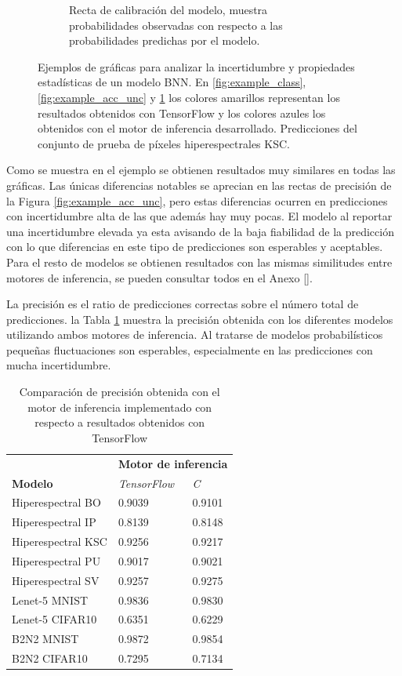 \begin{figure}[H]
\begin{subfigure}[b]{0.48\textwidth}
         \caption{Recta de calibración del modelo, muestra probabilidades observadas con respecto a las probabilidades predichas por el modelo.}
         \label{fig:example_calibration}
     \end{subfigure}
        \caption{Ejemplos de gráficas para analizar la incertidumbre y propiedades estadísticas de un modelo BNN. En \ref{fig:example_class}, \ref{fig:example_acc_unc} y \ref{fig:example_calibration} los colores amarillos representan los resultados obtenidos con TensorFlow y los colores azules los obtenidos con el motor de inferencia desarrollado. Predicciones del conjunto de prueba de píxeles hiperespectrales KSC.}
        \label{fig:figure_example}
\end{figure}

Como se muestra en el ejemplo se obtienen resultados muy similares en todas las gráficas. Las únicas diferencias notables se aprecian en las rectas de precisión de la Figura \ref{fig:example_acc_unc}, pero estas diferencias ocurren en predicciones con incertidumbre alta de las que además hay muy pocas. El modelo al reportar una incertidumbre elevada ya esta avisando de la baja fiabilidad de la predicción con lo que diferencias en este tipo de predicciones son esperables y aceptables. Para el resto de modelos se obtienen resultados con las mismas similitudes entre motores de inferencia, se pueden consultar todos en el Anexo \ref{}.

La precisión es el ratio de predicciones correctas sobre el número total de predicciones. la Tabla \ref{tab:engine_acc} muestra la precisión obtenida con los diferentes modelos utilizando ambos motores de inferencia. Al tratarse de modelos probabilísticos pequeñas fluctuaciones son esperables, especialmente en las predicciones con mucha incertidumbre.

\begin{table}[ht]
\centering
\caption{Comparación de precisión obtenida con el motor de inferencia implementado con respecto a resultados obtenidos con TensorFlow}
\label{tab:engine_acc}
\begin{tabular}{lll}
\hline
 &  \multicolumn{2}{c}{\textbf{Motor de inferencia}}\\
 \textbf{Modelo} & \textit{TensorFlow} & \textit{C} \\ \hline
 Hiperespectral BO   & 0.9039 & 0.9101 \\
 Hiperespectral IP   & 0.8139 & 0.8148 \\
 Hiperespectral KSC  & 0.9256 & 0.9217 \\
 Hiperespectral PU   & 0.9017 & 0.9021 \\
 Hiperespectral SV   & 0.9257 & 0.9275 \\
 Lenet-5 MNIST      & 0.9836 & 0.9830 \\
 Lenet-5 CIFAR10    & 0.6351 & 0.6229 \\
 B2N2 MNIST         & 0.9872 & 0.9854 \\
 B2N2 CIFAR10       & 0.7295 & 0.7134 \\\hline
\end{tabular}
\end{table}

